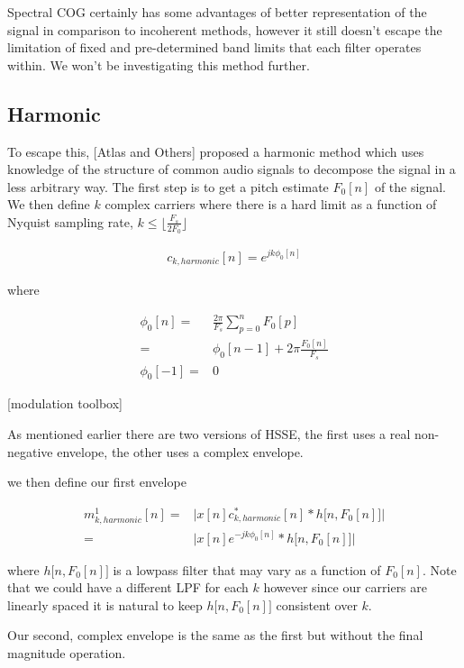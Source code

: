 \documentclass [11pt, proquest,oneside] {ganter_thesis}[2015/03/03]
\begin{document}
Spectral COG certainly has some advantages of better representation of the signal in comparison to incoherent methods, however it still doesn't escape the limitation of fixed and pre-determined band limits that each filter operates within.  We won't be investigating this method further.

\subsection{Harmonic}

To escape this, [Atlas and Others] proposed a harmonic method which uses knowledge of the structure of common audio signals to decompose the signal in a less arbitrary way.  The first step is to get a pitch estimate $F_0[n]$ of the signal.  We then define $k$ complex carriers where there is a hard limit as a function of Nyquist sampling rate, $k \leq  \lfloor \frac{F_s}{2F_0} \rfloor$

\begin{align}
c_{k,harmonic}[n] = e^{jk\phi_0 [n]}
\end{align}

where 

\begin{align}
\phi_0[n] =& \frac{2\pi}{F_s} \sum_{p=0}^{n} F_0[p] \nonumber \\
=& \phi_0[n - 1] + 2\pi \frac{F_0[n]}{F_s} \\
\phi_0[-1] =& 0 \nonumber
\end{align}

[modulation toolbox]

As mentioned earlier there are two versions of HSSE, the first uses a real non-negative envelope, the other uses a complex envelope.

we then define our first envelope

\begin{align}
m^1_{k,harmonic}[n] =& \Big| x[n] c_{k,harmonic}^*[n] * h\big[n, F_0[n] \big] \Big| \nonumber \\
=& \Big| x[n] e^{-jk\phi_0 [n]} * h\big[n, F_0[n] \big] \Big|
\end{align}

where $h\big[n, F_0[n] \big]$ is a lowpass filter that may vary as a function of $F_0[n]$.  Note that we could have a different LPF for each $k$ however since our carriers are linearly spaced it is natural to keep $h\big[n, F_0[n] \big]$ consistent over $k$.

Our second, complex envelope is the same as the first but without the final magnitude operation.
\end{document}
